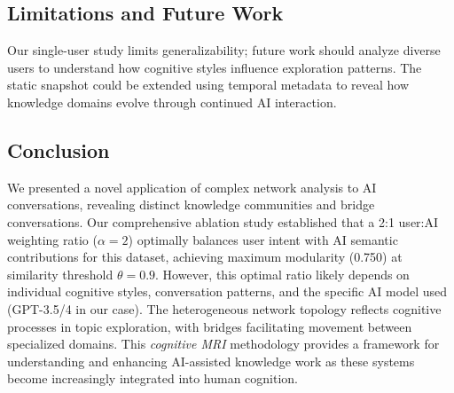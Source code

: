 \documentclass{svproc}
\begin{document}
\subsection{Limitations and Future Work}

Our single-user study limits generalizability; future work should analyze diverse users to understand how cognitive styles influence exploration patterns. The static snapshot could be extended using temporal metadata to reveal how knowledge domains evolve through continued AI interaction.

\subsection{Conclusion}

We presented a novel application of complex network analysis to AI conversations, revealing distinct knowledge communities and bridge conversations. Our comprehensive ablation study established that a 2:1 user:AI weighting ratio ($\alpha = 2$) optimally balances user intent with AI semantic contributions for this dataset, achieving maximum modularity (0.750) at similarity threshold $\theta = 0.9$. However, this optimal ratio likely depends on individual cognitive styles, conversation patterns, and the specific AI model used (GPT-3.5/4 in our case). The heterogeneous network topology reflects cognitive processes in topic exploration, with bridges facilitating movement between specialized domains. This \emph{cognitive MRI} methodology provides a framework for understanding and enhancing AI-assisted knowledge work as these systems become increasingly integrated into human cognition.
\end{document}
